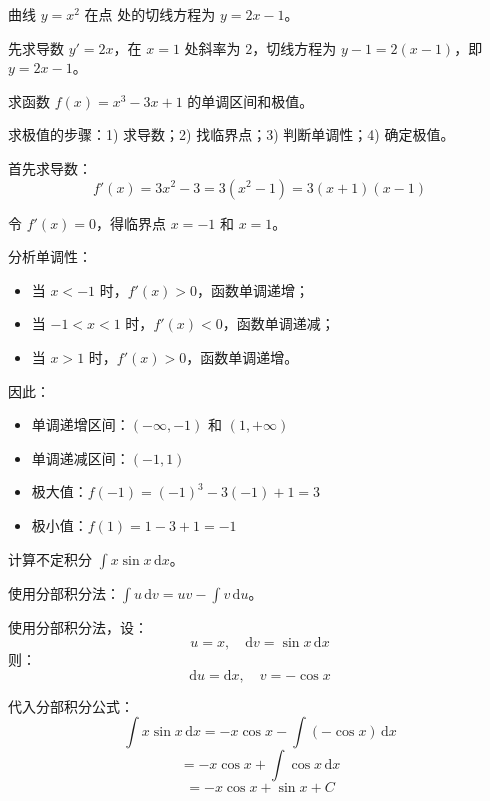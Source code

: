 \documentclass[answer]{THUExam}
\begin{document}
\begin{problem}
曲线 $y=x^2$ 在点  处的切线方程为 $y=2x-1$。
\end{problem}
\begin{note}
先求导数 $y'=2x$，在 $x=1$ 处斜率为 $2$，切线方程为 $y-1=2(x-1)$，即 $y=2x-1$。
\end{note}
\bigskip

\newpage
{}

\begin{problem}
求函数 $f(x)=x^3-3x+1$ 的单调区间和极值。
\end{problem}
\begin{note}
求极值的步骤：1) 求导数；2) 找临界点；3) 判断单调性；4) 确定极值。
\end{note}
\begin{solution}
首先求导数：
$$f'(x) = 3x^2 - 3 = 3(x^2-1) = 3(x+1)(x-1)$$

令 $f'(x)=0$，得临界点 $x=-1$ 和 $x=1$。

分析单调性：
\begin{itemize}
    \item 当 $x<-1$ 时，$f'(x)>0$，函数单调递增；
    \item 当 $-1<x<1$ 时，$f'(x)<0$，函数单调递减；
    \item 当 $x>1$ 时，$f'(x)>0$，函数单调递增。
\end{itemize}

因此：
\begin{itemize}
    \item 单调递增区间：$(-\infty,-1)$ 和 $(1,+\infty)$
    \item 单调递减区间：$(-1,1)$
    \item 极大值：$f(-1)=(-1)^3-3(-1)+1=3$
    \item 极小值：$f(1)=1-3+1=-1$
\end{itemize}
\end{solution}
\bigskip

\begin{problem}
计算不定积分 $\displaystyle\int x\sin x\,\mathrm{d}x$。
\end{problem}
\begin{note}
使用分部积分法：$\int u\,\mathrm{d}v = uv - \int v\,\mathrm{d}u$。
\end{note}
\begin{solution}
使用分部积分法，设：
$$u = x, \quad \mathrm{d}v = \sin x\,\mathrm{d}x$$
则：
$$\mathrm{d}u = \mathrm{d}x, \quad v = -\cos x$$

代入分部积分公式：
$$\int x\sin x\,\mathrm{d}x = -x\cos x - \int(-\cos x)\,\mathrm{d}x$$
$$= -x\cos x + \int\cos x\,\mathrm{d}x$$
$$= -x\cos x + \sin x + C$$
\end{solution}
\bigskip
\end{document}
